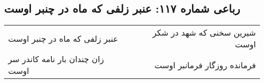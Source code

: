\begin{center}
\section*{رباعی شماره ۱۱۷: عنبر زلفی که ماه در چنبر اوست}
\label{sec:sh117}
\begin{longtable}{l p{0.5cm} r}
عنبر زلفی که ماه در چنبر اوست
&&
شیرین سخنی که شهد در شکر اوست
\\
زان چندان بار نامه کاندر سر اوست
&&
فرمانده روزگار فرمانبر اوست
\\
\end{longtable}
\end{center}

